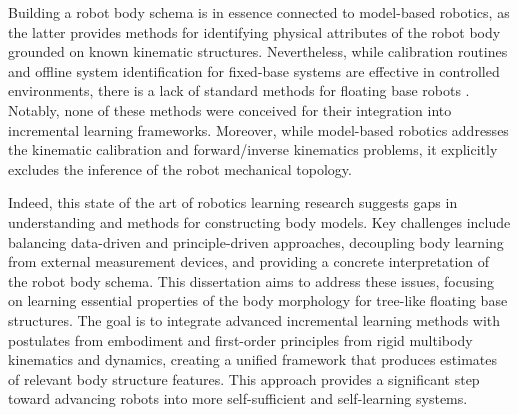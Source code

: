 \documentclass[12pt, a4paper]{article}
\begin{document}
Building a robot body schema is in essence connected to model-based robotics, as the latter provides methods for identifying physical attributes of the robot body grounded on known kinematic structures. Nevertheless, while calibration routines \cite{Hollerbach1996CalibrationIndexTaxonomy} and offline system identification \cite{Swevers2007Dynamicmodelidentification,LeboutetInertialParameterIdentification} for fixed-base systems are effective in controlled environments, there is a lack of standard methods for floating base robots \cite{Ayusawa2014Identifiabilityidentificationinertial,Lee2022OptimizedSystemIdentification}. Notably, none of these methods were conceived for their integration into incremental learning frameworks. Moreover, while model-based robotics addresses the kinematic calibration and forward/inverse kinematics problems, it explicitly excludes the inference of the robot mechanical topology. 

Indeed, this state of the art of robotics learning research suggests gaps in understanding and methods for constructing body models. Key challenges include balancing data-driven and principle-driven approaches, decoupling body learning from external measurement devices, and providing a concrete interpretation of the robot body schema. This dissertation aims to address these issues, focusing on learning essential properties of the body morphology for tree-like floating base structures. The goal is to integrate advanced incremental learning methods with postulates from embodiment and first-order principles from rigid multibody kinematics and dynamics, creating a unified framework that produces estimates of relevant body structure features. This approach provides a significant step toward advancing robots into more self-sufficient and self-learning systems.
\end{document}

